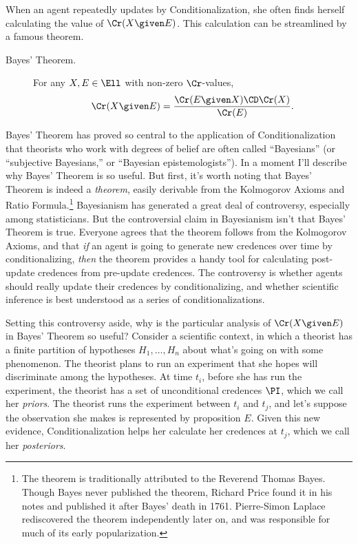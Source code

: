 When an agent repeatedly updates by Conditionalization, she often finds herself calculating the value of $\Cr(X \given E)$. This calculation can be streamlined by a famous theorem.
\begin{description}
\item[Bayes' Theorem.\,]{For any $X, E \in \Ell$ with non-zero $\Cr$-values, $$\Cr(X \given E)=\frac{\Cr(E \given X) \CD \Cr(X)}{\Cr(E)}.$$}
\end{description}
Bayes' Theorem has proved so central to the application of Conditionalization that theorists who work with degrees of belief are often called ``Bayesians'' (or ``subjective Bayesians,'' or ``Bayesian epistemologists''). In a moment I'll describe why Bayes' Theorem is so useful. But first, it's worth noting that Bayes' Theorem is indeed a \emph{theorem}, easily derivable from the Kolmogorov Axioms and Ratio Formula.\footnote
{The theorem is traditionally attributed to the Reverend Thomas Bayes. Though Bayes never published the theorem, Richard Price found it in his notes and published it after Bayes' death in 1761. Pierre-Simon Laplace rediscovered the theorem independently later on, and was responsible for much of its early popularization.} 
 Bayesianism has generated a great deal of controversy, especially among statisticians. But the controversial claim in Bayesianism isn't that Bayes' Theorem is true. Everyone agrees that the theorem follows from the Kolmogorov Axioms, and that \emph{if} an agent is going to generate new credences over time by conditionalizing, \emph{then} the theorem provides a handy tool for calculating post-update credences from pre-update credences. The controversy is whether agents should really update their credences by conditionalizing, and whether scientific inference is best understood as a series of conditionalizations.

Setting this controversy aside, why is the particular analysis of $\Cr(X \given E)$ in Bayes' Theorem so useful? Consider a scientific context, in which a theorist has a finite partition of hypotheses $H_1, \ldots, H_n$ about what's going on with some phenomenon. The theorist plans to run an experiment that she hopes will discriminate among the hypotheses. At time $t_i$, before she has run the experiment, the theorist has a set of unconditional credences $\PI$, which we call her \textit{priors}. The theorist runs the experiment between $t_i$ and $t_j$, and let's suppose the observation she makes is represented by proposition $E$. Given this new evidence, Conditionalization helps her calculate her credences at $t_j$, which we call her \textit{posteriors}.

